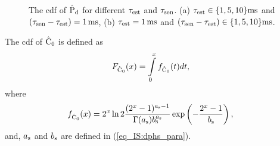 \begin{figure}[!ht]
{
\quad
\label{fig_IS:CDF_pd_tsen}}
\vspace{0.3cm}
\caption{The cdf of $\hat{\text{P}}_{\text{d}}$ for different $\tau_{\text{est}}$ and $\tau_{\text{sen}}$. (a) $\tau_{\text{est}} \in \{1,5,10\} \SI{}{ms}$ and $(\tau_{\text{sen}} - \tau_{\text{est}}) = \SI{1}{ms}$, (b) $\tau_{\text{est}} = \SI{1}{ms}$ and $(\tau_{\text{sen}} - \tau_{\text{est}}) \in \{1,5,10\} \SI{}{ms}$.}
\label{fig_IS:CDF_pd}
\end{figure}


\begin{lemma} \label{lm_IS:lem2}
\normalfont
The cdf of $\hat{\text{C}}_{\text{0}}$ is defined as
\begin{align}
F_{\hat{\text{C}}_{\text{0}}}(x) &= \int\limits_{0}^{x} f_{\hat{\text{C}}_{\text{0}}}(t) dt, \label{eq_IS:dis_C0} 
\end{align}
where
\begin{align}
f_{\hat{\text{C}}_{\text{0}}}(x) &= 2^x \ln 2 \frac{(2^x - 1)^{a_{\text{s}} - 1}}{\Gamma(a_{\text{s}}) b_{\text{s}}^{a_{\text{s}}}} \exp\left(-\frac{2^x - 1}{b_{\text{s}}}\right),  \label{eq_IS:den_C0}
\end{align}
and, $a_{\text{s}}$ and $b_{\text{s}}$ are defined in (\ref{eq_IS:dphs_para}).
\end{lemma} 
\begin{IEEEproof}[Solution]
\end{IEEEproof}

